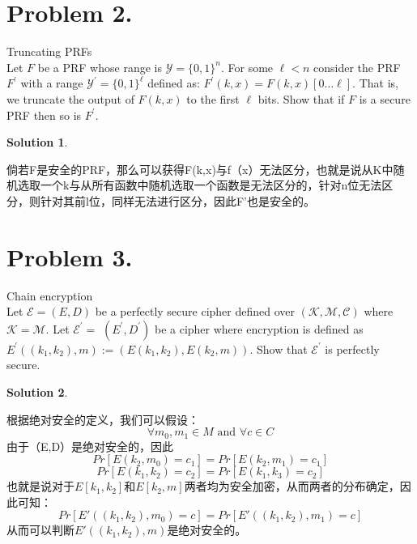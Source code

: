 \documentclass[UTF8,oneside]{article}
\newtheorem*{Solution}{Solution}
\begin{document}
\section*{Problem 2.}
Truncating PRFs\\
Let $F$ be a PRF whose range is $\mathcal{Y}=\{0,1\}^{n}$. For some $\ell<n$ consider the PRF $F^{\prime}$ with a range $\mathcal{Y}^{\prime}=\{0,1\}^{\ell}$ defined as: $F^{\prime}(k, x)=F(k, x)[0 \ldots \ell]$. That is, we truncate the output of $F(k, x)$ to the first $\ell$ bits. Show that if $F$ is a secure PRF then so is $F^{\prime}$.
\begin{Solution}
\end{Solution}
倘若F是安全的PRF，那么可以获得F(k,x)与f（x）无法区分，也就是说从K中随机选取一个k与从所有函数中随机选取一个函数是无法区分的，针对n位无法区分，则针对其前l位，同样无法进行区分，因此F'也是安全的。
\section*{Problem 3.}
Chain encryption\\
Let $\mathcal{E}=(E, D)$ be a perfectly secure cipher defined over $(\mathcal{K}, \mathcal{M}, \mathcal{C})$ where $\mathcal{K}=\mathcal{M}$. Let $\mathcal{E}^{\prime}=$ $\left(E^{\prime}, D^{\prime}\right)$ be a cipher where encryption is defined as $E^{\prime}\left(\left(k_{1}, k_{2}\right), m\right):=\left(E\left(k_{1}, k_{2}\right), E\left(k_{2}, m\right)\right)$. Show that $\mathcal{E}^{\prime}$ is perfectly secure.
\begin{Solution}
\end{Solution}
根据绝对安全的定义，我们可以假设：$$
\forall m_{0}, m_{1} \in M\text { and } \forall c \in C
$$
由于（E,D）是绝对安全的，因此
$$Pr[E(k_2,m_0)=c_1]=Pr[E(k_2,m_1)=c_1]$$
$$Pr[E(k_1,k_2)=c_2]=Pr[E(k_1,k_3)=c_2]$$
也就是说对于$E[k_1,k_2]和E[k_2,m]$两者均为安全加密，从而两者的分布确定，因此可知：
$$Pr[E'((k_1,k_2),m_0)=c]=Pr[E'((k_1,k_2),m_1)=c]$$
从而可以判断$E'((k_1,k_2),m)$是绝对安全的。
\end{document}
